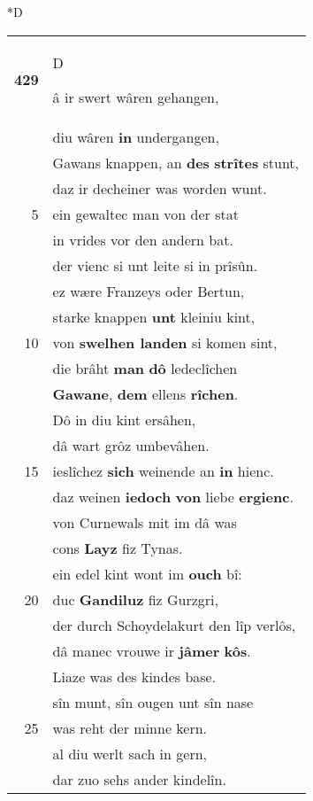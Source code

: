 \documentclass[8pt,a4paper,notitlepage]{article}
\begin{document}
\begin{table}[ht]
\begin{minipage}[t]{0.5\linewidth}
\small
\begin{center}*D
\end{center}
\begin{tabular}{rl}
\textbf{429} & \begin{large}D\end{large}â ir swert wâren gehangen,\\ 
 & diu wâren \textbf{in} undergangen,\\ 
 & Gawans knappen, an \textbf{des} \textbf{strîtes} stunt,\\ 
 & daz ir decheiner was worden wunt.\\ 
5 & ein gewaltec man von der stat\\ 
 & in vrides vor den andern bat.\\ 
 & der vienc si unt leite si in prîsûn.\\ 
 & ez wære Franzeys oder Bertun,\\ 
 & starke knappen \textbf{unt} kleiniu kint,\\ 
10 & von \textbf{swelhen landen} si komen sint,\\ 
 & die brâht \textbf{man} \textbf{dô} ledeclîchen\\ 
 & \textbf{Gawane}, \textbf{dem} ellens \textbf{rîchen}.\\ 
 & Dô in diu kint ersâhen,\\ 
 & dâ wart grôz umbevâhen.\\ 
15 & ieslîchez \textbf{sich} weinende an \textbf{in} hienc.\\ 
 & daz weinen \textbf{iedoch} \textbf{von} liebe \textbf{ergienc}.\\ 
 & von Curnewals mit im dâ was\\ 
 & cons \textbf{Layz} fiz Tynas.\\ 
 & ein edel kint wont im \textbf{ouch} bî:\\ 
20 & duc \textbf{Gandiluz} fiz Gurzgri,\\ 
 & der durch Schoydelakurt den lîp verlôs,\\ 
 & dâ manec vrouwe ir \textbf{jâmer} \textbf{kôs}.\\ 
 & Liaze was des kindes base.\\ 
 & sîn munt, sîn ougen unt sîn nase\\ 
25 & was reht der minne kern.\\ 
 & al diu werlt sach in gern,\\ 
 & dar zuo sehs ander kindelîn.\\ 

\end{tabular}
\end{minipage}
\end{table}
\end{document}
